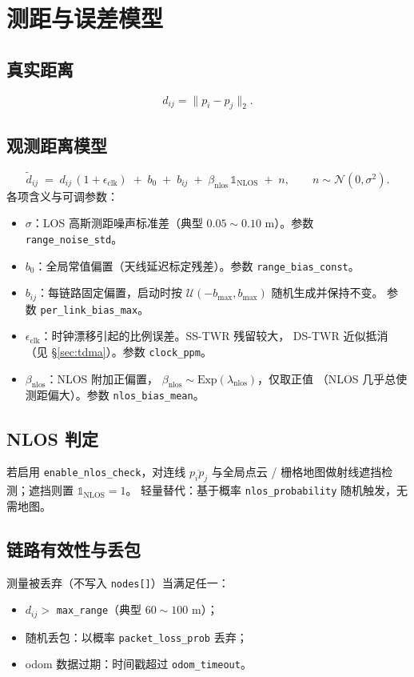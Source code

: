 \documentclass[11pt,a4paper]{article}
\begin{document}
\section{测距与误差模型}
\subsection{真实距离}
$$ d_{ij} = \lVert p_i - p_j \rVert_2 . $$

\subsection{观测距离模型}
$$
\tilde{d}_{ij} \;=\; d_{ij}\,(1+\epsilon_{\text{clk}})
              \;+\; b_0 \;+\; b_{ij}
              \;+\; \beta_{\text{nlos}}\,\mathbb{1}_{\text{NLOS}}
              \;+\; n,\qquad n\sim\mathcal{N}(0,\sigma^2).
$$
各项含义与可调参数：
\begin{itemize}[leftmargin=1.4em]
  \item $\sigma$：LOS 高斯测距噪声标准差（典型 $0.05\sim0.10$ m）。参数
        \texttt{range\_noise\_std}。
  \item $b_0$：全局常值偏置（天线延迟标定残差）。参数 \texttt{range\_bias\_const}。
  \item $b_{ij}$：每链路固定偏置，启动时按
        $\mathcal{U}(-b_{\max},b_{\max})$ 随机生成并保持不变。
        参数 \texttt{per\_link\_bias\_max}。
  \item $\epsilon_{\text{clk}}$：时钟漂移引起的比例误差。SS-TWR 残留较大，
        DS-TWR 近似抵消（见 \S\ref{sec:tdma}）。参数 \texttt{clock\_ppm}。
  \item $\beta_{\text{nlos}}$：NLOS 附加正偏置，
        $\beta_{\text{nlos}}\sim\text{Exp}(\lambda_{\text{nlos}})$，仅取正值
        （NLOS 几乎总使测距偏大）。参数 \texttt{nlos\_bias\_mean}。
\end{itemize}

\subsection{NLOS 判定}
若启用 \texttt{enable\_nlos\_check}，对连线 $\overline{p_i p_j}$ 与全局点云 /
栅格地图做射线遮挡检测；遮挡则置 $\mathbb{1}_{\text{NLOS}}=1$。
轻量替代：基于概率 \texttt{nlos\_probability} 随机触发，无需地图。

\subsection{链路有效性与丢包}
测量被丢弃（不写入 \texttt{nodes[]}）当满足任一：
\begin{itemize}[leftmargin=1.4em]
  \item $d_{ij} > $ \texttt{max\_range}（典型 $60\sim100$ m）；
  \item 随机丢包：以概率 \texttt{packet\_loss\_prob} 丢弃；
  \item odom 数据过期：时间戳超过 \texttt{odom\_timeout}。
\end{itemize}
\end{document}

